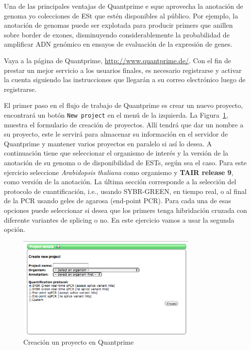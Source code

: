 \documentclass[letter,11pt]{book}
\begin{document}
Una de las principales ventajas de {\sc Quantprime} e sque aprovecha la anotación de genoma y\/o colecciones de ESt que estén disponibles al público. Por ejemplo, la anotación de genomas puede ser explotada para producir primers que anillen sobre border de exones, disminuyendo considerablemente la probabilidad de amplificar ADN genómico en ensayos de evaluación de la expresión de genes.

Vaya a la página de {\sc Quantprime}, \url{http://www.quantprime.de/}. Con el fin de prestar un mejor servicio a los usuarios finales, es necesario registrarse y activar la cuenta siguiendo las instrucciones que llegarán a su correo electrónico luego de registrarse.

El primer paso en el flujo de trabajo de {\sc Quantprime} es crear un nuevo proyecto, encontrará un botón \Verb+New project+ en el menú de la izquierda. La Figura~\ref{fig:QP_createproject}, muestra el formulario de creación de proyectos. Allí tendrá que dar un nombre a su proyecto, este le servirá para almacenar su información en el servidor de  {\sc Quantprime} y mantener varios proyectos en paralelo si así lo desea. A continuación tiene que seleccionar el organismo de interés y la versión de la anotación de su genoma o de disponibilidad de ESTs, según sea el caso. Para este ejercicio seleccione \textit{Arabidopsis thaliana} como organismo y \textbf{TAIR release 9}, como versión de la anotación. La última sección corresponde a la selección del protocolo de cuantificación, i.e., usando SYBR-GREEN, en tiempo real, o al final de la PCR usando geles de agarosa (end-point  PCR). Para cada una de esas opciones puede seleccionar si desea que los primers tenga hibridación cruzada con diferente variantes de splicing o no. En este ejercicio vamos a usar la segunda opción.

\begin{figure}[h!]
\centering
 \includegraphics[width=9cm]{Figs/QP_createproject.png}
 \caption{\label{fig:QP_createproject}Creación un proyecto en {\sc Quantprime}}
\end{figure}
\end{document}
